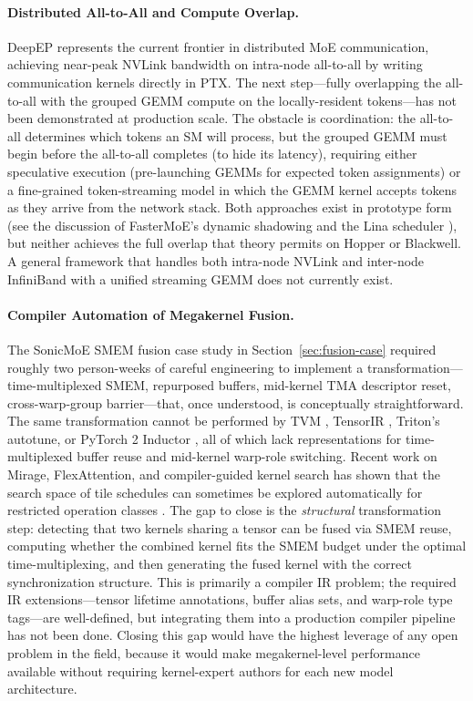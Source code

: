 \documentclass[10pt]{article}
\begin{document}
\paragraph{Distributed All-to-All and Compute Overlap.}
DeepEP \citep{deepep2024} represents the current frontier in distributed MoE communication, achieving near-peak NVLink bandwidth on intra-node all-to-all by writing communication kernels directly in PTX. The next step---fully overlapping the all-to-all with the grouped GEMM compute on the locally-resident tokens---has not been demonstrated at production scale. The obstacle is coordination: the all-to-all determines which tokens an SM will process, but the grouped GEMM must begin before the all-to-all completes (to hide its latency), requiring either speculative execution (pre-launching GEMMs for expected token assignments) or a fine-grained token-streaming model in which the GEMM kernel accepts tokens as they arrive from the network stack. Both approaches exist in prototype form (see the discussion of FasterMoE's dynamic shadowing \citep{he2022fastermoe} and the Lina scheduler \citep{li2023lina}), but neither achieves the full overlap that theory permits on Hopper or Blackwell. A general framework that handles both intra-node NVLink and inter-node InfiniBand with a unified streaming GEMM does not currently exist.

\paragraph{Compiler Automation of Megakernel Fusion.}
The SonicMoE SMEM fusion case study in Section~\ref{sec:fusion-case} required roughly two person-weeks of careful engineering to implement a transformation---time-multiplexed SMEM, repurposed buffers, mid-kernel TMA descriptor reset, cross-warp-group barrier---that, once understood, is conceptually straightforward. The same transformation cannot be performed by TVM \citep{chen2018tvm}, TensorIR \citep{feng2023tensorir}, Triton's autotune, or PyTorch 2 Inductor \citep{ansel2024torchcompile}, all of which lack representations for time-multiplexed buffer reuse and mid-kernel warp-role switching. Recent work on Mirage, FlexAttention, and compiler-guided kernel search has shown that the search space of tile schedules can sometimes be explored automatically for restricted operation classes \citep{ye2025flashinfer}. The gap to close is the \emph{structural} transformation step: detecting that two kernels sharing a tensor can be fused via SMEM reuse, computing whether the combined kernel fits the SMEM budget under the optimal time-multiplexing, and then generating the fused kernel with the correct synchronization structure. This is primarily a compiler IR problem; the required IR extensions---tensor lifetime annotations, buffer alias sets, and warp-role type tags---are well-defined, but integrating them into a production compiler pipeline has not been done. Closing this gap would have the highest leverage of any open problem in the field, because it would make megakernel-level performance available without requiring kernel-expert authors for each new model architecture.
\end{document}
